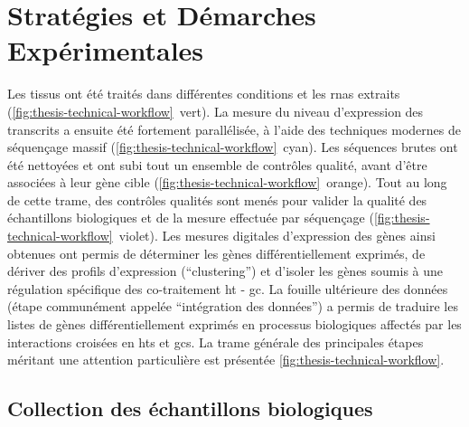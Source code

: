 \documentclass[../main.tex]{subfiles}
\begin{document}
\chapter{Stratégies et Démarches Expérimentales}

Les tissus ont été traités dans différentes conditions et les \glspl{rna} extraits (\autoref{fig:thesis-technical-workflow}~vert).
La mesure du niveau d'expression des transcrits a ensuite été fortement parallélisée, à l'aide des techniques modernes de séquençage massif (\autoref{fig:thesis-technical-workflow}~cyan).
Les séquences brutes ont été nettoyées et ont subi tout un ensemble de contrôles qualité, avant d'être associées à leur gène cible (\autoref{fig:thesis-technical-workflow}~orange).
Tout au long de cette trame, des contrôles qualités sont menés pour valider la qualité des échantillons biologiques et de la mesure effectuée par séquençage (\autoref{fig:thesis-technical-workflow}~violet).
Les mesures digitales d'expression des gènes ainsi obtenues ont permis de déterminer les gènes différentiellement exprimés, de dériver des profils d'expression (``clustering'') et d'isoler les gènes soumis à une régulation spécifique des co-traitement \gls{ht} - \gls{gc}.
La fouille ultérieure des données (étape communément appelée ``intégration des données'') a permis de traduire les listes de gènes différentiellement exprimés en processus biologiques affectés par les interactions croisées en \glspl{ht} et \glspl{gc}. 
La trame générale des principales étapes méritant une attention particulière est présentée \autoref{fig:thesis-technical-workflow}.





\section{Collection des échantillons biologiques}\label{sec:col-bio-samples}
\end{document}
